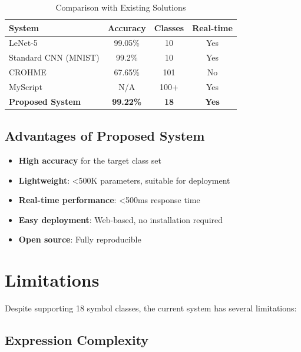 \documentclass[conference]{IEEEtran}
\begin{document}
\begin{table}[htbp]
\caption{Comparison with Existing Solutions}
\label{tab:comparison}
\centering
\begin{tabular}{|p{2.5cm}|c|c|c|}
\hline
\textbf{System} & \textbf{Accuracy} & \textbf{Classes} & \textbf{Real-time} \\
\hline
LeNet-5 \cite{lecun1998gradient} & 99.05\% & 10 & Yes \\
Standard CNN (MNIST) & 99.2\% & 10 & Yes \\
CROHME \cite{mouchere2016icfhr2016} & 67.65\% & 101 & No \\
MyScript & N/A & 100+ & Yes \\
\textbf{Proposed System} & \textbf{99.22\%} & \textbf{18} & \textbf{Yes} \\
\hline
\end{tabular}
\end{table}

\subsection{Advantages of Proposed System}

\begin{itemize}
    \item \textbf{High accuracy} for the target class set
    \item \textbf{Lightweight}: <500K parameters, suitable for deployment
    \item \textbf{Real-time performance}: <500ms response time
    \item \textbf{Easy deployment}: Web-based, no installation required
    \item \textbf{Open source}: Fully reproducible
\end{itemize}

\section{Limitations}

Despite supporting 18 symbol classes, the current system has several limitations:

\subsection{Expression Complexity}
\end{document}
